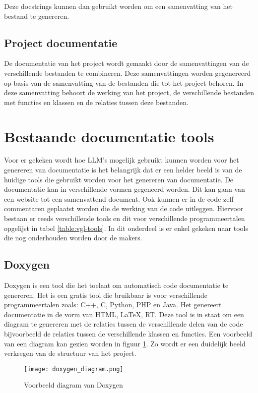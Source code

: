 Deze docstrings kunnen dan gebruikt worden om een samenvatting van het bestand te genereren.

\subsection{Project documentatie}
\label{sec:project-documentatie-literatuur}
De documentatie van het project wordt gemaakt door de samenvattingen van de verschillende bestanden te combineren.
Deze samenvattingen worden gegenereerd op basis van de samenvatting van de bestanden die tot het project behoren.
In deze samenvatting behoort de werking van het project, de verschillende bestanden met functies en klassen en de relaties tussen deze bestanden.


\section{Bestaande documentatie tools}
\label{sec:huidige-tools}
Voor er gekeken wordt hoe LLM's mogelijk gebruikt kunnen worden voor het genereren van documentatie is het belangrijk dat er een helder beeld is van de huidige tools die gebruikt worden voor het genereren van documentatie.
De documentatie kan in verschillende vormen gegeneerd worden. Dit kan gaan van een website tot een samenvattend document.
Ook kunnen er in de code zelf commentaren geplaatst worden die de werking van de code uitleggen.
Hiervoor bestaan er reeds verschillende tools en dit voor verschillende programmeertalen opgelijst in tabel \ref{table:vgl-tools}.
In dit onderdeel is er enkel gekeken naar tools die nog onderhouden worden door de makers. 

\subsection{Doxygen}
Doxygen \autocite{Doxygen2023} is een tool die het toelaat om automatisch code documentatie te genereren. Het is een gratis tool die bruikbaar is voor verschillende programmeertalen zoals: C++, C, Python, PHP en Java.
Het genereert documentatie in de vorm van HTML, LaTeX, RT. 
Deze tool is in staat om een diagram te genereren met de relaties tussen de verschillende delen van de code bijvoorbeeld de relaties tussen de verschillende klassen en functies.
Een voorbeeld van een diagram kan gezien worden in figuur \ref{fig:Doxygen-diagram}.
Zo wordt er een duidelijk beeld verkregen van de structuur van het project.

\begin{figure}[h]
  \centering
  \texttt{[image: doxygen\_diagram.png]}
  \caption{Voorbeeld diagram van Doxygen \autocite{Doxygen2023}}
  \label{fig:Doxygen-diagram}
\end{figure}

